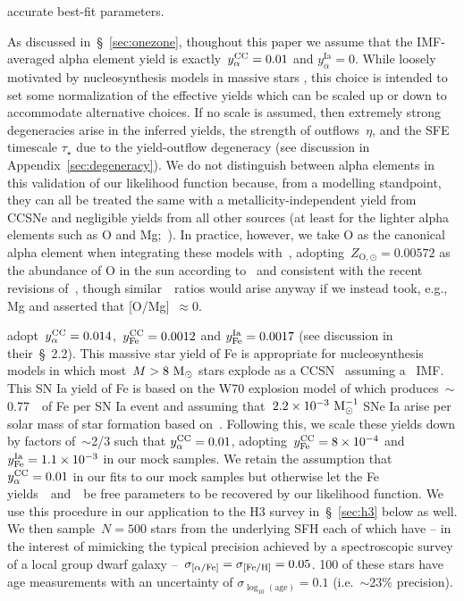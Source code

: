 \documentclass[ms.tex]{subfiles}
\begin{document}
accurate best-fit parameters.
\par
As discussed in~\S~\ref{sec:onezone}, thoughout this paper we assume that the
IMF-averaged alpha element yield is exactly~$y_\alpha^\text{CC} = 0.01$ and
$y_\alpha^\text{Ia} = 0$.
While loosely motivated by nucleosynthesis models in massive stars
\citep[e.g.][]{Nomoto2013, Sukhbold2016, Limongi2018}, this choice is intended
to set some normalization of the effective yields which can be scaled up or
down to accommodate alternative choices.
If no scale is assumed, then extremely strong degeneracies arise in the
inferred yields, the strength of outflows~$\eta$, and the SFE timescale
$\tau_\star$ due to the yield-outflow degeneracy (see discussion in
Appendix~\ref{sec:degeneracy}).
We do not distinguish between alpha elements in this validation of our
likelihood function because, from a modelling standpoint, they can all be
treated the same with a metallicity-independent yield from CCSNe and negligible
yields from all other sources (at least for the lighter alpha elements such as
O and Mg;~\citealp{Johnson2019}).
In practice, however, we take O as the canonical alpha element when integrating
these models with~\vice, adopting~$Z_{\text{O},\odot} = 0.00572$ as the
abundance of O in the sun according to~\citet{Asplund2009} and consistent with
the recent revisions of~\citet*{Asplund2021}, though similar~\afe~ratios would
arise anyway if we instead took, e.g., Mg and asserted that [O/Mg]~$\approx 0$.
\par
\citet{Weinberg2017} adopt~$y_\alpha^\text{CC} = 0.014$,~$y_\text{Fe}^\text{CC} = 0.0012$ and
$y_\text{Fe}^\text{Ia} = 0.0017$ (see discussion in their~\S~2.2).
This massive star yield of Fe is appropriate for nucleosynthesis models in
which most~$M > 8~\text{M}_\odot$ stars explode as a CCSN~\citep[e.g.][]{Woosley1995,
Chieffi2004, Chieffi2013, Nomoto2013} assuming a~\citet{Kroupa2001} IMF.
This SN Ia yield of Fe is based on the W70 explosion model of
\citet{Iwamoto1999} which produces~$\sim$0.77~\msun~of Fe per SN Ia event and
assuming that~$2.2\times10^{-3}~\text{M}_\odot^{-1}$ SNe Ia arise per solar mass of
star formation based on~\citet{Maoz2012a}.
Following this, we scale these yields down by factors of~$\sim$2/3 such that
$y_\alpha^\text{CC} = 0.01$, adopting~$y_\text{Fe}^\text{CC} = 8\times10^{-4}$ and
$y_\text{Fe}^\text{Ia} = 1.1\times10^{-3}$ in our mock samples.
We retain the assumption that~$y_\alpha^\text{CC} = 0.01$ in our fits to our mock samples
but otherwise let the Fe yields~\yfecc~and~\yfeia~be free parameters to be
recovered by our likelihood function.
We use this procedure in our application to the H3 survey
in~\S~\ref{sec:h3} below as well.
We then sample~$N = 500$ stars from the underlying SFH each of which have -- in
the interest of mimicking the typical precision achieved by a spectroscopic
survey of a local group dwarf galaxy --~$\sigma_{\text{[$\alpha$/Fe]}} = \sigma_{\text{[Fe/H]}} = 0.05$.
100 of these stars have age measurements with an uncertainty of
$\sigma_{\log_{10}(\text{age})} = 0.1$ (i.e.~$\sim$23\% precision).
\end{document}
